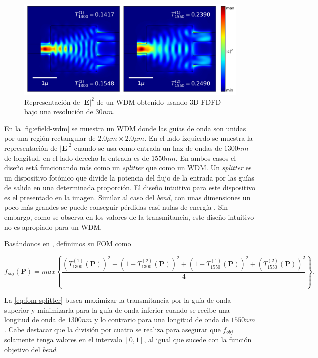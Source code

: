 \begin{figure}[ht]
  \centering
  \includegraphics[scale=0.7]{image/theory/wdm_field_dx30_px16_px16.png}
  \caption{Representación de $|\boldsymbol{E}|^2$ de un WDM obtenido usando 3D FDFD bajo una resolución de $30 nm$.}
  \label{fig:efield-wdm}
\end{figure}

En la \autoref{fig:efield-wdm} se muestra un WDM donde las guías de onda son unidas por una región rectangular
de $2.0\mu m \times 2.0 \mu m$. En el lado izquierdo se muestra la representación de $|\boldsymbol{E}|^2$ cuando se usa 
como entrada un haz de ondas de $1300 nm$ de longitud, en el lado derecho la entrada es de $1550 nm$.
En ambos casos el diseño está funcionando más como un \emph{splitter} que como un WDM.
Un \emph{splitter} es un dispositivo fotónico que divide la potencia del flujo de la entrada por las guías
de salida en una determinada proporción. El diseño intuitivo para este dispositivo es el presentado en la imagen. Similar al caso del
\emph{bend}, con unas dimensiones un poco más grandes se puede conseguir pérdidas casi nulas de energía
\citep{LukasChrostowski2010}.
Sin embargo, como se observa en los valores de la transmitancia, este diseño intuitivo no es apropiado para un WDM.

Basándonos en \cite{Su2020}, definimos su FOM como

\begin{equation}
  f_{obj}(\boldsymbol{P}) = max \left \{ \frac{\left ( T_{1300}^{(1)}(\boldsymbol{P}) \right )^2  + 
                            \left ( 1 - T_{1300}^{(2)}(\boldsymbol{P}) \right )^2 +
                            \left ( 1 - T_{1550}^{(1)}(\boldsymbol{P}) \right )^2  + 
                            \left ( T_{1550}^{(2)}(\boldsymbol{P}) \right )^2 }{4}
                    \right \}.
\label{eq:fom-splitter}
\end{equation}

La \autoref{eq:fom-splitter} busca maximizar la transmitancia por la guía de onda superior y minimizarla para
la guía de onda inferior cuando se recibe una longitud de onda de $1300 nm$ y lo contrario para una longitud
de onda de $1550 nm$. Cabe destacar que la división por cuatro se realiza para asegurar que $f_{obj}$ solamente
tenga valores en el intervalo $[0, 1]$, al igual que sucede con la función objetivo del \emph{bend}.

